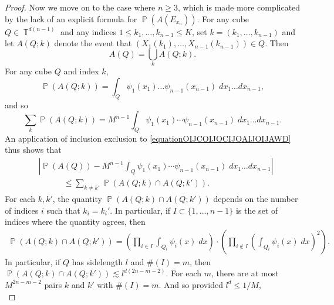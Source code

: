 \documentclass[dvipsnames,letterpaper,12pt]{article}
\numberwithin{equation}{section}
\DeclareMathOperator{\TT}{\mathbb{T}}
\numberwithin{theorem}{section}
\DeclareMathOperator{\PP}{\mathbb{P}}
\begin{document}
\begin{proof}
    Now we move on to the case where $n \geq 3$, which is made more complicated by the lack of an explicit formula for $\PP(A(E_{x_n}))$. For any cube $Q \in \TT^{d(n-1)}$ and any indices $1 \leq k_1,\dots,k_{n-1} \leq K$, set $k = (k_1,\dots,k_{n-1})$ and let $A(Q;k)$ denote the event that $(X_1(k_1),\dots,X_{n-1}(k_{n-1})) \in Q$. Then
    \begin{equation}
        A(Q) = \bigcup_k A(Q;k).
    \end{equation}
    For any cube $Q$ and index $k$,
    \begin{equation}
        \PP(A(Q;k)) = \int_Q \psi_1(x_1) \dots \psi_{n-1}(x_{n-1})\; dx_1 \dots dx_{n-1},
    \end{equation}
    and so
    \begin{equation} \label{equationOIJCOIJOCIJOAIJOIJAWD}
        \sum_k \PP(A(Q;k)) = M^{n-1} \int_Q \psi_1(x_1) \cdots \psi_{n-1}(x_{n-1})\; dx_1 \dots dx_{n-1}.
    \end{equation}
    An application of inclusion exclusion to \eqref{equationOIJCOIJOCIJOAIJOIJAWD} thus shows that
    \begin{equation} \label{equationIOJVOIVJOVIJPSPOPCOISAPCOIACC}
    \begin{split}
        &\left| \PP(A(Q)) - M^{n-1} \int_Q \psi_1(x_1) \cdots \psi_{n-1}(x_{n-1})\; dx_1 \dots dx_{n-1} \right|\\
        &\quad\quad\quad\leq \sum_{k \neq k'} \PP(A(Q;k) \cap A(Q;k')).
    \end{split}
    \end{equation}
    For each $k,k'$, the quantity $\PP(A(Q;k) \cap A(Q;k'))$ depends on the number of indices $i$ such that $k_i = k_i'$. In particular, if $I \subset \{ 1, \dots, n-1 \}$ is the set of indices where the quantity agrees, then
    \begin{equation}
    \begin{split}
        \PP(A(Q;k) \cap A(Q;k')) = \left( \prod_{i \in I} \int_{Q_i} \psi_i(x)\; dx \right) \cdot \left( \prod_{i \not \in I} \left( \int_{Q_i} \psi_i(x)\; dx \right)^2 \right).
    \end{split}
    \end{equation}
    In particular, if $Q$ has sidelength $l$ and $\#(I) = m$, then $\PP(A(Q;k) \cap A(Q;k')) \lesssim l^{d(2n - m - 2)}$. For each $m$, there are at most $M^{2n - m - 2}$ pairs $k$ and $k'$ with $\#(I) = m$. And so provided $l^d \leq 1/M$,
    \begin{equation} \label{equationCIOJIOJIJCS312412412}

\end{equation}
\end{proof}
\end{document}
